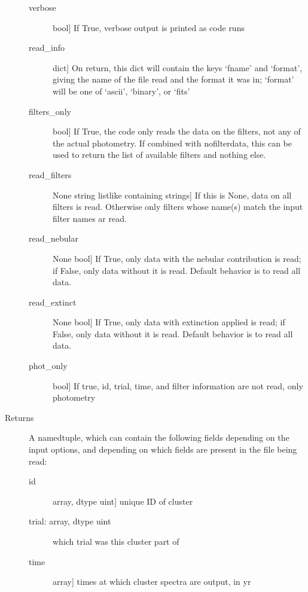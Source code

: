 \documentclass[letterpaper,10pt,english]{sphinxmanual}
\begin{document}
\begin{fulllineitems}
\begin{description}
\begin{description}
\item[{verbose}] \leavevmode{[}bool{]}
If True, verbose output is printed as code runs

\item[{read\_info}] \leavevmode{[}dict{]}
On return, this dict will contain the keys ‘fname’ and
‘format’, giving the name of the file read and the format it
was in; ‘format’ will be one of ‘ascii’, ‘binary’, or ‘fits’

\item[{filters\_only}] \leavevmode{[}bool{]}
If True, the code only reads the data on the filters, not
any of the actual photometry. If combined with nofilterdata,
this can be used to return the list of available filters
and nothing else.

\item[{read\_filters}] \leavevmode{[}None \textbar{} string \textbar{} listlike containing strings{]}
If this is None, data on all filters is read. Otherwise only
filters whose name(s) match the input filter names ar
read.

\item[{read\_nebular}] \leavevmode{[}None \textbar{} bool{]}
If True, only data with the nebular contribution is read; if
False, only data without it is read. Default behavior is to
read all data.

\item[{read\_extinct}] \leavevmode{[}None \textbar{} bool{]}
If True, only data with extinction applied is read; if
False, only data without it is read. Default behavior is to
read all data.

\item[{phot\_only}] \leavevmode{[}bool{]}
If true, id, trial, time, and filter information are not
read, only photometry

\end{description}

\item[{Returns}] \leavevmode
A namedtuple, which can contain the following fields depending
on the input options, and depending on which fields are present
in the file being read:
\begin{description}
\item[{id}] \leavevmode{[}array, dtype uint{]}
unique ID of cluster

\item[{trial: array, dtype uint}] \leavevmode
which trial was this cluster part of

\item[{time}] \leavevmode{[}array{]}
times at which cluster spectra are output, in yr


\end{description}
\end{description}
\end{fulllineitems}
\end{document}
